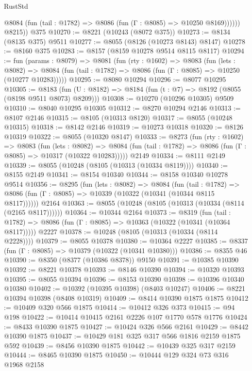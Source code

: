 \begin{lexlean}{RustStd}
\begin{coremodule}
{\begin{coremodule}
{{{{{{{{{{{{{{{{{{{{{{{{{{{{{{{{{{{{{{{{{{{{{{{              @8084 (fun (tail : @1782) => @8086 (fun (Γ : @8085) => @10250 @8169))))))
        @8215))
    @375
@10270 := @8221 (@10243 (@8072 @375))
@10273 := @8134 (@8135 @375) @9511
@10277 := @8055 (@8126 (@10273 @8143) @8147)
@10278 := @8160 @375
@10283 := @8157 (@8159 @10278 @9514 @8115 @8117)
@10294 := fun (params : @8079) =>
  @8081
    (fun (rty : @1602) =>
    @8083
      (fun (lets : @8082) =>
      @8084 (fun (tail : @1782) => @8086 (fun (Γ : @8085) => @10250 (@10277 @10283)))))
@10295 := @8080 @10294
@10296 := @8077 @10295
@10305 := @8183 (fun (U : @8182) => @8184 (fun (t : @7) => @8192 (@8055 (@8198 @9511 @8073) @8209)))
@10308 := @10270 (@10296 @10305) @9509
@10310 := @8040 @10295 @10305
@10312 := @8270 @10294 @2146
@10313 := @8107 @2146
@10315 := @8105 (@10313 @8120)
@10317 := @8055 (@10248 @10315)
@10318 := @8142 @2146
@10319 := @10273 @10318
@10320 := @8126 @10319
@10322 := @8055 (@10320 @8147)
@10333 := @8273
    (fun (rty : @1602) =>
    @8083
      (fun (lets : @8082) =>
      @8084 (fun (tail : @1782) => @8086 (fun (Γ : @8085) => @10317 (@10322 @10283)))))
    @2149
@10334 := @8111 @2149
@10339 := @8055 (@10248 (@8105 (@10313 (@10334 @8119))))
@10340 := @8155 @2149
@10341 := @8154 @10340
@10344 := @8158 @10340 @10278 @9514
@10356 := @8295
    (fun (lets : @8082) =>
    @8084
      (fun (tail : @1782) =>
      @8086 (fun (Γ : @8085) => @10339 (@10322 (@10341 (@10344 @8115 @8117))))))
    @2164
@10363 := @8055 (@10248 (@8105 (@10313 (@10334 (@8114 (@2165 @8117))))))
@10364 := @10344 @2164
@10373 := @8319
    (fun (tail : @1782) => @8086 (fun (Γ : @8085) => @10363 (@10322 (@10341 (@10364 @8117)))))
    @2227
@10378 := @10248 (@8105 (@10313 (@10334 (@8114 @2228))))
@10379 := @8055 @10378
@10380 := @10364 @2227
@10385 := @8337 (fun (Γ : @8085) => @10379 (@10322 (@10341 @10380)))
@10386 := @8355 @46
@10390 := @8350 (@8377 (@10386 @8378)) @9150
@10391 := @10385 @10390
@10392 := @8221 @10378
@10393 := @8146 @10390
@10394 := @10320 @10393
@10395 := @8055 @10394
@10396 := @8153 @10390
@10398 := @10396 @10340 @10380
@10402 := @10392 (@10395 @10398) (@8403 @10247)
@10406 := @8221 @10394 @10398 (@8408 @10319)
@10409 := @8414 @10390 @1875 @1875
@10412 := @10409 @320 @566 @1875
@10414 := @10412 @326 @373
@10415 := @94 @198
@10422 := @10414 @10415 @2161 @2226 @107 @1770 @578 @1776
@10424 := @8433 @10390 @1875
@10427 := @10424 @326 @566 @2161
@10429 := @8442 @10390 @1875
@10437 := @10429 @181 @325 @317 @566 @1816 @2159 @1875 @592
@10439 := @8456 @10390 @1875
@10442 := @10439 @325 @317 @2159
@10444 := @8465 @10390 @1875
@10450 := @10444 @129 @324 @73 @316 @1968 @2158
}}}}}}}}}}}}}}}}}}}}}}}}}}}}}}}}}}}}}}}}}}}}}}}
\end{coremodule}}
\end{coremodule}
\end{lexlean}
